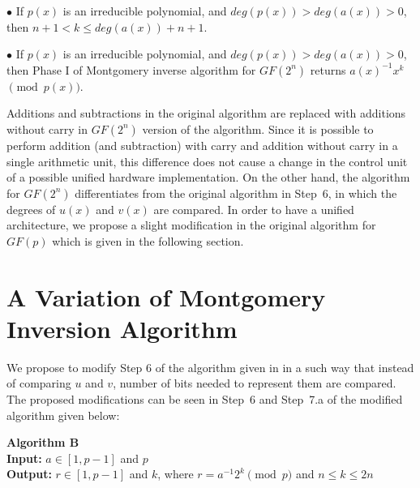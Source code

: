 \documentclass[twocolumn]{IEEEtran}
\begin{document}
\noindent $\bullet$ 
If $p(x)$ is an irreducible polynomial, and $deg(p(x))>deg(a(x))>0$, then
$n + 1 < k \leq deg(a(x)) + n + 1$.  

\noindent $\bullet$ 
If $p(x)$ is an irreducible polynomial, and $deg(p(x))>deg(a(x))>0$, then 
Phase I of Montgomery inverse algorithm for $GF(2^n)$ returns $a(x)^{-1}x^k$
$\pmod{p(x)}$.

Additions and subtractions in the original algorithm are replaced with 
additions without carry in $GF(2^n)$ version of the algorithm. Since it is
possible to perform addition (and subtraction) with carry and addition
without carry in a single arithmetic unit, this difference does not 
cause a change in the control unit of a possible unified hardware implementation.  
On the other hand, the algorithm for $GF(2^n)$ differentiates from the original 
algorithm in Step~6, in which the degrees of $u(x)$ and $v(x)$ are compared.
In order to have a unified architecture,
we propose a slight modification in the original algorithm
for $GF(p)$ which is given in the following section.  

\section {A Variation of Montgomery Inversion Algorithm}

We propose to modify Step 6 of the algorithm given in \cite{K95:The} in a
such way that instead of comparing $u$ and
$v$, number of bits needed  to represent them are compared.
The proposed modifications can be seen in Step~6 and
Step~7.a of the modified algorithm given below: 

\medskip 

\noindent \textbf{Algorithm B} \\
\textbf{Input:} $a \in [1,p-1]$ and $p$ \\
\textbf{Output:} $r \in [1,p-1]$ and $k$, where
$r=a^{-1}2^k \pmod{p}$ and $n \leq k \leq 2n$
\end{document}
